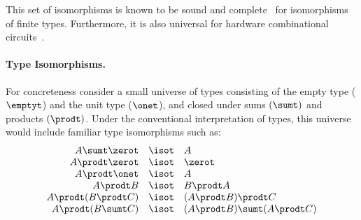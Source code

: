 

This set of isomorphisms is known to be sound and
complete~\cite*{fioreIsomorphismsGenericRecursive2004,fioreRemarksIsomorphismsTyped2002} for isomorphisms of finite
types. Furthermore, it is also universal for hardware combinational circuits~\cite{jamesInformationEffects2012}.



\paragraph*{Type Isomorphisms.} For concreteness consider a small universe of
types consisting of the empty type ($\emptyt$) and the unit type ($\onet$), and
closed under sums $(\sumt)$ and products $(\prodt)$. Under the conventional
interpretation of types, this universe would include familiar type isomorphisms
such as:
\[\begin{array}{rcl}
    A \sumt \zerot &\isot& A \\
    A \prodt \zerot &\isot& \zerot \\
    A \prodt \onet &\isot& A \\
    A \prodt B &\isot& B \prodt A \\
    A \prodt (B \prodt C) &\isot& (A \prodt B) \prodt C \\
    A \prodt (B \sumt C) &\isot& (A \prodt B) \sumt (A \prodt C)
\end{array}\]


